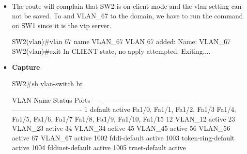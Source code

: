 \documentclass[10pt]{article}
\begin{document}
\subsection{}
\begin{itemize}
\item The route will complain that SW2 is on client mode and the vlan setting can not be saved. To and VLAN\_67 to the domain, we have to run the command on SW1 since it is the vtp server.
\begin{verbatim*}
SW2(vlan)#vlan 67 name VLAN_67
VLAN 67 added:
Name: VLAN_67
SW2(vlan)#exit
In CLIENT state, no apply attempted.
Exiting....
\end{verbatim*}
\item {\bf Capture}
\begin{verbatim*}
SW2#sh vlan-switch br

VLAN Name                             Status    Ports
---- -------------------------------- --------- -------------------------------
1    default                          active    Fa1/0, Fa1/1, Fa1/2, Fa1/3
                                                Fa1/4, Fa1/5, Fa1/6, Fa1/7
                                                Fa1/8, Fa1/9, Fa1/10, Fa1/15
12   VLAN_12                          active
23   VLAN_23                          active
34   VLAN_34                          active
45   VLAN_45                          active
56   VLAN_56                          active
67   VLAN_67                          active
1002 fddi-default                     active
1003 token-ring-default               active
1004 fddinet-default                  active
1005 trnet-default                    active
\end{verbatim*}
\end{itemize}
\end{document}
